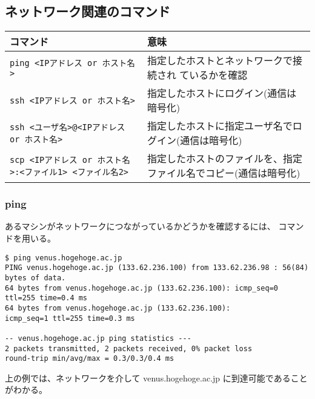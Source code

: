\documentclass{jreport}
\begin{document}
\subsection{ネットワーク関連のコマンド}

{\small
\begin{tabular}[t]{lp{6cm}}\hline
コマンド & 意味 \\ \hline
\verb|ping <IPアドレス or ホスト名>| & 指定したホストとネットワークで接続され
ているかを確認 \\
\verb|ssh <IPアドレス or ホスト名>| & 指定したホストにログイン(通信は暗号化)
\\
\verb|ssh <ユーザ名>@<IPアドレス or ホスト名>| & 
指定したホストに指定ユーザ名でログイン(通信は暗号化)
\\
\verb|scp <IPアドレス or ホスト名>:<ファイル1> <ファイル名2>|& 
指定したホストのファイルを、指定ファイル名でコピー(通信は暗号化)
\\
\hline
\end{tabular}}

\subsubsection{ping}
あるマシンがネットワークにつながっているかどうかを確認するには、
 コマンドを用いる。
\begin{screen}
\begin{verbatim}
$ ping venus.hogehoge.ac.jp
PING venus.hogehoge.ac.jp (133.62.236.100) from 133.62.236.98 : 56(84) bytes of data.
64 bytes from venus.hogehoge.ac.jp (133.62.236.100): icmp_seq=0 ttl=255 time=0.4 ms
64 bytes from venus.hogehoge.ac.jp (133.62.236.100):
icmp_seq=1 ttl=255 time=0.3 ms

-- venus.hogehoge.ac.jp ping statistics ---
2 packets transmitted, 2 packets received, 0% packet loss
round-trip min/avg/max = 0.3/0.3/0.4 ms
\end{verbatim}
\end{screen}
上の例では、ネットワークを介して venus.hogehoge.ac.jp に到達可能であることがわかる。
\end{document}
